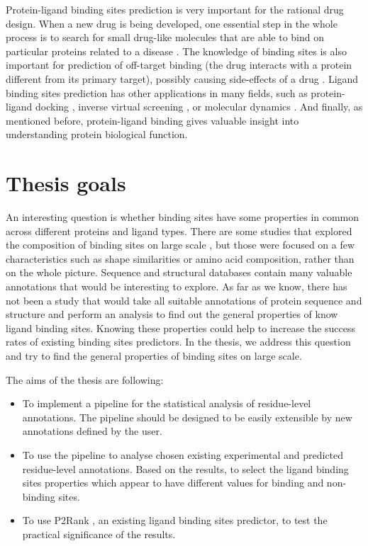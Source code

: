 Protein-ligand binding sites prediction is very important for the rational drug design. When a new drug is being developed, one essential step in the whole process is to search for small drug-like molecules that are able to bind on particular proteins related to a disease \cite{drug_design}. The knowledge of binding sites is also important for prediction of off-target binding (the drug interacts with a protein different from its primary target), possibly causing side-effects of a drug \cite{offtarget}. Ligand binding sites prediction has other applications in many fields, such as protein-ligand docking \cite{docking}, inverse virtual screening \cite{screening}, or molecular dynamics \cite{dynamics}. And finally, as mentioned before, protein-ligand binding gives valuable insight into understanding protein biological function. 

\section{Thesis goals}

An interesting question is whether binding sites have some properties in common across different proteins and ligand types. There are some studies that explored the composition of binding sites on large scale \cite{lbscomposition, catalytic_res, binding_sites_char}, but those were focused on a few characteristics such as shape similarities or amino acid composition, rather than on the whole picture. Sequence and structural databases contain many valuable annotations that would be interesting to explore. As far as we know, there has not been a study that would take all suitable annotations of protein sequence and structure and perform an analysis to find out the general properties of know ligand binding sites. Knowing these properties could help to increase the success rates of existing binding sites predictors. In the thesis, we address this question and try to find the general properties of binding sites on large scale.

The aims of the thesis are following:

\begin{itemize}
\item To implement a pipeline for the statistical analysis of residue-level annotations. The pipeline should be designed to be easily extensible by new annotations defined by the user.
\item To use the pipeline to analyse chosen existing experimental and predicted residue-level annotations. Based on the results, to select the ligand binding sites properties which appear to have different values for binding and non-binding sites.
\item To use P2Rank \cite{p2rank1}, an existing ligand binding sites predictor, to test the practical significance of the results.
\end{itemize}

